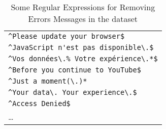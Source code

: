 \begin{table}[ht]
\begin{tabular}{|l|}
\verb|^Please update your browser$| \\
\verb|^JavaScript n'est pas disponible\.$| \\
\verb|^Vos données\.% Votre expérience\.*$| \\
\verb|^Before you continue to YouTube$| \\
\verb|^Just a moment(\.)*| \\
\verb|^Your data\. Your experience\.$| \\
\verb|^Access Denied$| \\
\ldots \\
\hline
\end{tabular}
\caption{Some Regular Expressions for Removing Errors Messages in the  \VSI{} dataset}
\label{appendix02:tab:error_messages}
\end{table}








\label{appendix02:pesv_noise_removal}

